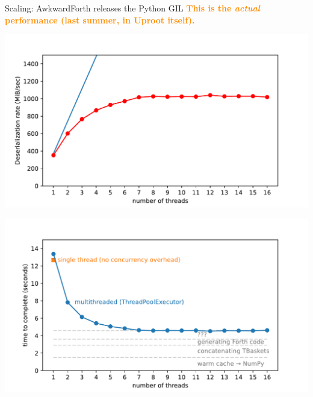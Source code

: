 \documentclass[aspectratio=169]{beamer}
\begin{document}
\begin{frame}{Scaling: AwkwardForth releases the Python GIL}
\vspace{0.5 cm}
\textcolor{darkorange}{\bf \centering This is the {\it actual} performance (last summer, in Uproot itself).}

\vspace{-0.25 cm}
\mbox{\hspace{-1 cm}} \includegraphics[width=0.7\linewidth]{PLOTS/awkwardforth-in-uproot-jagged3-scaling.pdf}

\vspace{-4 cm}
\hfill \includegraphics[width=0.7\linewidth]{PLOTS/awkwardforth-in-uproot-jagged3-scaling-reasons.pdf} \mbox{\hspace{-1.5 cm}}
\end{frame}
\end{document}
